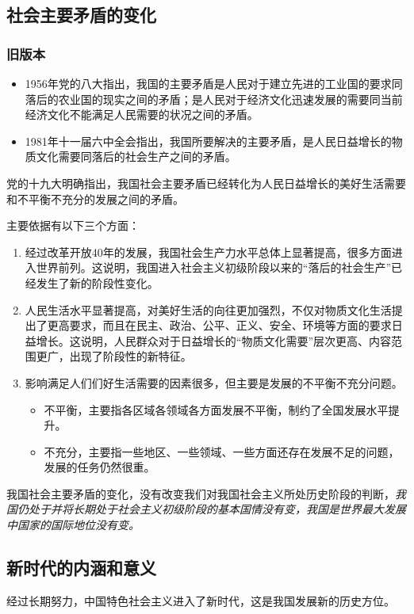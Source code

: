     \subsection{社会主要矛盾的变化}
        \subsubsection{旧版本}
        \begin{itemize}
            \item 1956年党的八大指出，我国的主要矛盾是人民对于建立先进的工业国的要求同落后的农业国的现实之间的矛盾；是人民对于经济文化迅速发展的需要同当前经济文化不能满足人民需要的状况之间的矛盾。
            \item 1981年十一届六中全会指出，我国所要解决的主要矛盾，是人民日益增长的物质文化需要同落后的社会生产之间的矛盾。
        \end{itemize}

        党的十九大明确指出，我国社会主要矛盾已经转化为人民日益增长的美好生活需要和不平衡不充分的发展之间的矛盾。

        主要依据有以下三个方面：
        \begin{enumerate}
            \item 经过改革开放40年的发展，我国社会生产力水平总体上显著提高，很多方面进入世界前列。这说明，我国进入社会主义初级阶段以来的“落后的社会生产”已经发生了新的阶段性变化。
            \item 人民生活水平显著提高，对美好生活的向往更加强烈，不仅对物质文化生活提出了更高要求，而且在民主、政治、公平、正义、安全、环境等方面的要求日益增长。这说明，人民群众对于日益增长的“物质文化需要”层次更高、内容范围更广，出现了阶段性的新特征。
            \item 影响满足人们们好生活需要的因素很多，但主要是发展的不平衡不充分问题。
            \begin{itemize}
                \item 不平衡，主要指各区域各领域各方面发展不平衡，制约了全国发展水平提升。
                \item 不充分，主要指一些地区、一些领域、一些方面还存在发展不足的问题，发展的任务仍然很重。
            \end{itemize}
        \end{enumerate}

        我国社会主要矛盾的变化，没有改变我们对我国社会主义所处历史阶段的判断，\emph{我国仍处于并将长期处于社会主义初级阶段的基本国情没有变，我国是世界最大发展中国家的国际地位没有变。}

    \subsection{新时代的内涵和意义}
        经过长期努力，中国特色社会主义进入了新时代，这是我国发展新的历史方位。
